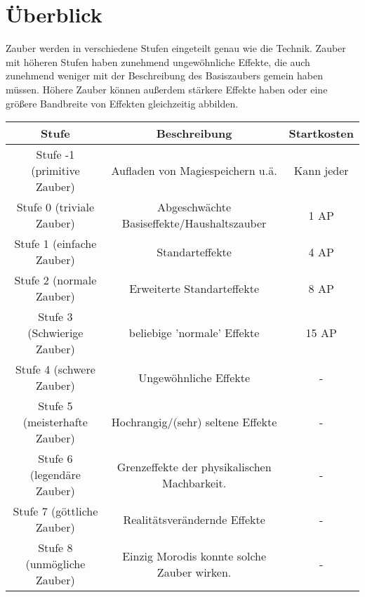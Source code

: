 \section{Überblick}
\label{Zaubergenerierung}
Zauber werden in verschiedene Stufen eingeteilt genau wie die Technik. Zauber mit höheren Stufen haben zunehmend ungewöhnliche Effekte, die auch zunehmend weniger mit der Beschreibung des Basiszaubers gemein haben müssen. Höhere Zauber können außerdem stärkere Effekte haben oder eine größere Bandbreite von Effekten gleichzeitig abbilden.
\begin{tabulary}{\textwidth}{|C|C|C|}
\hline 
Stufe & Beschreibung & Startkosten\\ 
\hline
Stufe -1 (primitive Zauber)&Aufladen von Magiespeichern u.ä.&Kann jeder\\
\hline
Stufe 0 (triviale Zauber)&Abgeschwächte Basiseffekte/Haushaltszauber&1 AP\\
\hline 
Stufe 1 (einfache Zauber)&Standarteffekte&4 AP\\
\hline 
Stufe 2 (normale Zauber)&Erweiterte Standarteffekte&8 AP\\
\hline 
Stufe 3 (Schwierige Zauber)&beliebige 'normale' Effekte&15 AP\\
\hline 
Stufe 4 (schwere Zauber)&Ungewöhnliche Effekte&-\\
\hline 
Stufe 5 (meisterhafte Zauber)&Hochrangig/(sehr) seltene Effekte&-\\
\hline 
Stufe 6 (legendäre Zauber)&Grenzeffekte der physikalischen Machbarkeit.&-\\
\hline 
Stufe 7 (göttliche Zauber)&Realitätsverändernde Effekte&-\\
\hline 
Stufe 8 (unmögliche Zauber)&Einzig Morodis konnte solche Zauber wirken.&-\\
\hline 
\end{tabulary}

